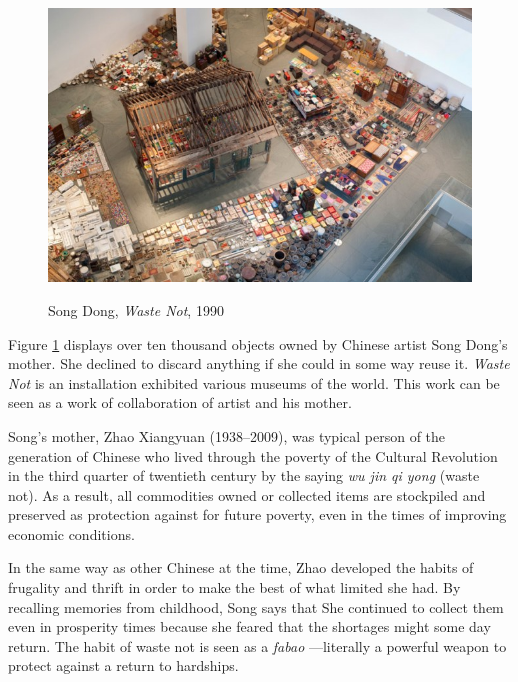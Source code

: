 \begin{figure}[h!]
  \centering
  \includegraphics[height=8cm]{graphics/SongDong_WasteNot.jpg}
  \caption{Song Dong, \textit{Waste Not}, 1990}
  \label{fig:SongDong_WasteNot}
\end{figure}

Figure \ref{fig:SongDong_WasteNot} displays over ten thousand objects owned by Chinese artist Song Dong’s mother. She declined to discard anything if she could in some way reuse it. \textit{Waste Not} is an installation exhibited various museums of the world. This work can be seen as a work of collaboration of artist and his mother.

Song’s mother, Zhao Xiangyuan (1938–2009), was typical person of the generation of Chinese who lived through the poverty of the Cultural Revolution in the third quarter of twentieth century by the saying \textit{wu jin qi yong} (waste not). As a result, all commodities owned or collected items are stockpiled and preserved as protection against for future poverty, even in the times of improving economic conditions.

In the same way as other Chinese at the time, Zhao developed the habits of frugality and thrift in order to make the best of what limited she had. By recalling memories from childhood, Song says that  She continued to collect them even in prosperity times because she feared that the shortages might some day return. The habit of waste not is seen as a \textit{fabao} ---literally a powerful weapon to protect against a return to hardships.

